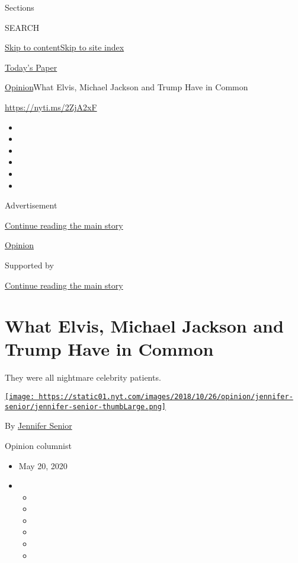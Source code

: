 Sections

SEARCH

\protect\hyperlink{site-content}{Skip to
content}\protect\hyperlink{site-index}{Skip to site index}

\href{https://myaccount.nytimes.com/auth/login?response_type=cookie\&client_id=vi}{}

\href{https://www.nytimes.com/section/todayspaper}{Today's Paper}

\href{/section/opinion}{Opinion}\textbar{}What Elvis, Michael Jackson
and Trump Have in Common

\href{https://nyti.ms/2ZjA2xF}{https://nyti.ms/2ZjA2xF}

\begin{itemize}
\item
\item
\item
\item
\item
\item
\end{itemize}

Advertisement

\protect\hyperlink{after-top}{Continue reading the main story}

\href{/section/opinion}{Opinion}

Supported by

\protect\hyperlink{after-sponsor}{Continue reading the main story}

\hypertarget{what-elvis-michael-jackson-and-trump-have-in-common}{%
\section{What Elvis, Michael Jackson and Trump Have in
Common}\label{what-elvis-michael-jackson-and-trump-have-in-common}}

They were all nightmare celebrity patients.

\href{https://www.nytimes.com/by/jennifer-senior}{\texttt{[image: https://static01.nyt.com/images/2018/10/26/opinion/jennifer-senior/jennifer-senior-thumbLarge.png]}}

By \href{https://www.nytimes.com/by/jennifer-senior}{Jennifer Senior}

Opinion columnist

\begin{itemize}
\item
  May 20, 2020
\item
  \begin{itemize}
  \item
  \item
  \item
  \item
  \item
  \item
  \end{itemize}
\end{itemize}

